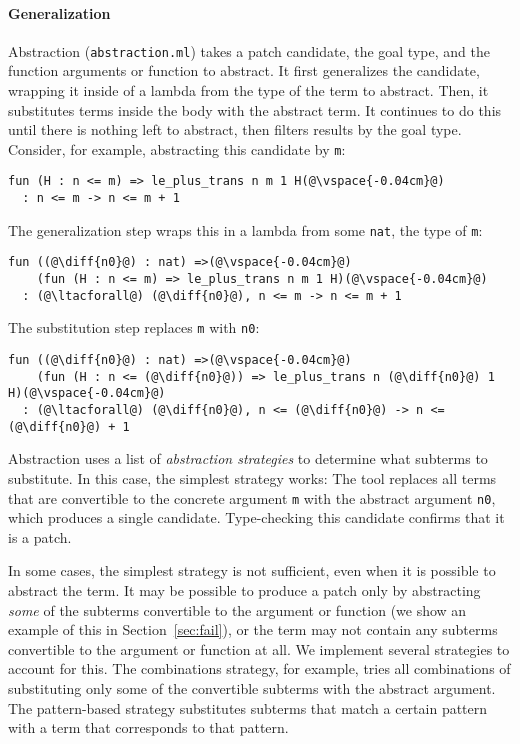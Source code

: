 \paragraph{Generalization} Abstraction (\lstinline{abstraction.ml}) takes a patch candidate, 
the goal type, and the function arguments or function to abstract.
It first generalizes the candidate, wrapping it inside of a lambda from the type of the term to abstract.
Then, it substitutes terms inside the body with the abstract term.
It continues to do this until there is nothing left to abstract, then filters results by the goal type.
Consider, for example, abstracting this candidate by \lstinline{m}:

\begin{lstlisting}[language=coq]
  fun (H : n <= m) => le_plus_trans n m 1 H(@\vspace{-0.04cm}@)
  : n <= m -> n <= m + 1
\end{lstlisting}
The generalization step wraps this in a lambda from some \lstinline{nat}, the type of \lstinline{m}:

\begin{lstlisting}[language=coq]
  fun ((@\diff{n0}@) : nat) =>(@\vspace{-0.04cm}@)
    (fun (H : n <= m) => le_plus_trans n m 1 H)(@\vspace{-0.04cm}@)
  : (@\ltacforall@) (@\diff{n0}@), n <= m -> n <= m + 1
\end{lstlisting}
The substitution step replaces \lstinline{m} with \lstinline{n0}:

\begin{lstlisting}[language=coq]
  fun ((@\diff{n0}@) : nat) =>(@\vspace{-0.04cm}@)
    (fun (H : n <= (@\diff{n0}@)) => le_plus_trans n (@\diff{n0}@) 1 H)(@\vspace{-0.04cm}@)
  : (@\ltacforall@) (@\diff{n0}@), n <= (@\diff{n0}@) -> n <= (@\diff{n0}@) + 1
\end{lstlisting}

Abstraction uses a list of \textit{abstraction strategies} to determine what subterms
to substitute. In this case, the simplest strategy works: The tool
replaces all terms that are convertible to the concrete argument \lstinline{m} with the abstract argument
\lstinline{n0}, which produces a single candidate. Type-checking this candidate confirms that it is a patch.

In some cases, the simplest strategy is not sufficient, even when it is possible to abstract the term.
It may be possible to produce a patch only by abstracting \emph{some} of the subterms
convertible to the argument or function (we show an example of this in Section~\ref{sec:fail}),
or the term may not contain any subterms convertible to the argument or function at all.
We implement several strategies to account for this. The combinations strategy, for example,
tries all combinations of substituting only some of the convertible subterms with the abstract argument. 
The pattern-based strategy substitutes subterms that match a certain pattern
with a term that corresponds to that pattern.

